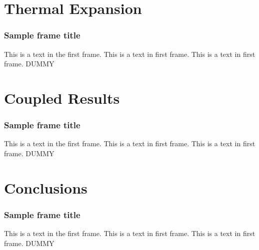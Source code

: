 \documentclass[professionalfont]{beamer}
\begin{document}
\section{Thermal Expansion}
  \begin{frame}
    \frametitle{Sample frame title}
    This is a text in the first frame. This is a text in first frame. This is a
    text in first frame. DUMMY
  \end{frame}

\section{Coupled Results}
  \begin{frame}
    \frametitle{Sample frame title}
    This is a text in the first frame. This is a text in first frame. This is a
    text in first frame. DUMMY
  \end{frame}

\section{Conclusions}
  \begin{frame}
    \frametitle{Sample frame title}
    This is a text in the first frame. This is a text in first frame. This is a
    text in first frame. DUMMY
  \end{frame}
  
\section{} %
\end{document}
